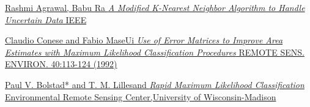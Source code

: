 \begin{thebibliography}{}
                                                                                                                                  \href{http://ieeexplore.ieee.org/stamp/stamp.jsp?tp=&arnumber=7292920}{Rashmi Agrawal, Babu Ra
                                                                                                                                  \textit{A Modified K-Nearest Neighbor Algorithm to 
                                                                                                                                  Handle Uncertain Data}
                                                                                                                                  IEEE }


                                                                                                                                  \href{https://ac.els-cdn.com/0034425792900099/1-s2.0-0034425792900099-main.pdf?_tid=f260f935-fe14-452f-a631-f45b8e155a6a&acdnat=1521463467_14a81fb39951774dfe565c23495c632f}{Claudio Conese and Fabio MaseUi 
                                                                                                                                  \textit{Use of Error Matrices to Improve Area
                                                                                                                                  Estimates with Maximum Likelihood
                                                                                                                                  Classification Procedures}
                                                                                                                                  REMOTE SENS. ENVIRON. 40:113-124 (1992) }

                                                                                                                                  \href{https://www.asprs.org/wp-content/uploads/pers/1991journal/jan/1991_jan_67-74.pdf}{Paul V. Bolstad* and T. M. Lillesand
                                                                                                                                  \textit{Rapid Maximum Likelihood Classification}
                                                                                                                                  Environmental Remote Sensing Center,University of Wisconsin-Madison}

                                                                                                                                  \end{thebibliography}


